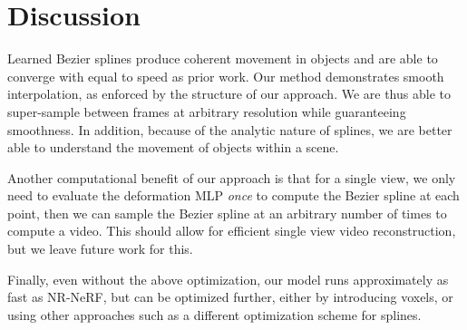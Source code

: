 \section*{Discussion}

Learned Bezier splines produce coherent movement in objects and are able to converge with equal to speed as prior work. Our method demonstrates smooth interpolation, as enforced by the structure of our approach. We are thus able to super-sample between frames at arbitrary resolution while guaranteeing smoothness. In addition, because of the analytic nature of splines, we are better able to understand the movement of objects within a scene.

Another computational benefit of our approach is that for a single view, we only need to evaluate the deformation MLP \textit{once} to compute the Bezier spline at each point, then we can sample the Bezier spline at an arbitrary number of times to compute a video. This should allow for efficient single view video reconstruction, but we leave future work for this.

Finally, even without the above optimization, our model runs approximately as fast as NR-NeRF, but can be optimized further, either by introducing voxels, or using other approaches such as a different optimization scheme for splines.